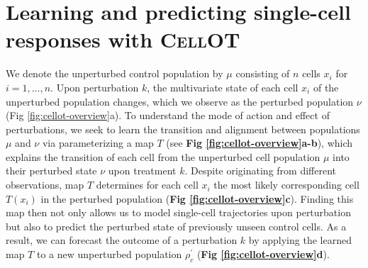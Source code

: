 \section{Learning and predicting single-cell responses with \textsc{CellOT}}


We denote the unperturbed control population by $\mu$ consisting of $n$ cells $x_i$ for $i = 1, \dots, n$.
Upon perturbation $k$, the multivariate state of each cell $x_i$ of the unperturbed population changes, which we observe as the perturbed population $\nu$ (Fig \ref{fig:cellot-overview}a).
To understand the mode of action and effect of perturbations, we seek to learn the transition and alignment between populations $\mu$ and $\nu$ via parameterizing a map $T$ (see \textbf{Fig \ref{fig:cellot-overview}a-b}), which explains the transition of each cell from the unperturbed cell population $\mu$ into their perturbed state $\nu$ upon treatment $k$.
Despite originating from  different observations, map $T$ determines for each cell $x_i$ the most likely corresponding cell $T(x_i)$ in the perturbed population (\textbf{Fig \ref{fig:cellot-overview}c}).
Finding this map then not only allows us to model single-cell trajectories upon perturbation but also to predict the perturbed state of previously unseen control cells.
As a result, we can forecast the outcome of a perturbation $k$  by applying the learned map $T$ to a new unperturbed population $\rho^\prime_c$ (\textbf{Fig \ref{fig:cellot-overview}d}).

